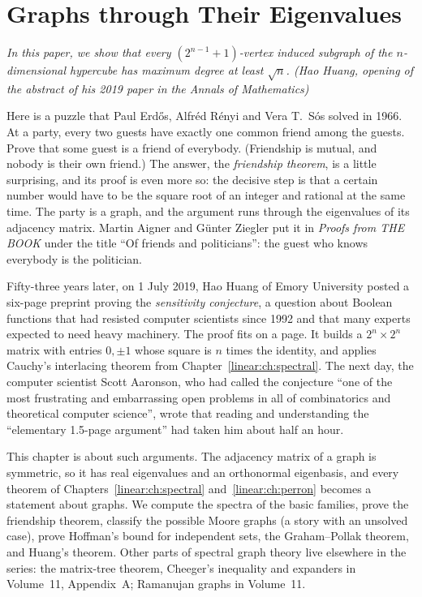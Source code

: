 \chapter{Graphs through Their Eigenvalues}\label{linear:ch:graphs}

\begin{center}\itshape
In this paper, we show that every $(2^{n-1}+1)$-vertex induced subgraph of the $n$-dimensional hypercube has maximum degree at
least $\sqrt n$.
\upshape(Hao Huang, opening of the abstract of his 2019 paper in the \emph{Annals of Mathematics})
\end{center}

Here is a puzzle that Paul Erd\H{o}s, Alfr\'ed R\'enyi and Vera T.~S\'os solved in 1966. At a party, every two guests have
exactly one common friend among the guests. Prove that some guest is a friend of everybody. (Friendship is mutual, and
nobody is their own friend.) The answer, the \emph{friendship theorem}, is a little surprising, and its proof is even more so:
the decisive step is that a certain number would have to be the square root of an integer and rational at the same time.
The party is a graph, and the argument runs through the eigenvalues of its adjacency matrix. Martin Aigner and G\"unter
Ziegler put it in \emph{Proofs from THE BOOK} under the title ``Of friends and politicians'': the guest who knows everybody
is the politician.

Fifty-three years later, on 1 July 2019, Hao Huang of Emory University posted a six-page preprint proving the
\emph{sensitivity conjecture}, a question about Boolean functions that had resisted computer scientists since 1992 and
that many experts expected to need heavy machinery. The proof fits on a page. It builds a $2^n\times2^n$ matrix with entries
$0,\pm1$ whose square is $n$ times the identity, and applies Cauchy's interlacing theorem from Chapter~\ref{linear:ch:spectral}.
The next day, the computer scientist Scott Aaronson, who had called the conjecture ``one of the most frustrating and
embarrassing open problems in all of combinatorics and theoretical computer science'', wrote that reading and understanding
the ``elementary 1.5-page argument'' had taken him about half an hour.

This chapter is about such arguments. The adjacency matrix of a graph is symmetric, so it has real eigenvalues and an
orthonormal eigenbasis, and every theorem of Chapters~\ref{linear:ch:spectral} and~\ref{linear:ch:perron} becomes a statement about graphs.
We compute the spectra of the basic families, prove the friendship theorem, classify the possible Moore graphs (a story with
an unsolved case), prove Hoffman's bound for independent sets, the Graham--Pollak theorem, and Huang's theorem. Other parts
of spectral graph theory live elsewhere in the series: the matrix-tree theorem, Cheeger's inequality and expanders in
Volume~11, Appendix~A; Ramanujan graphs in Volume~11.

